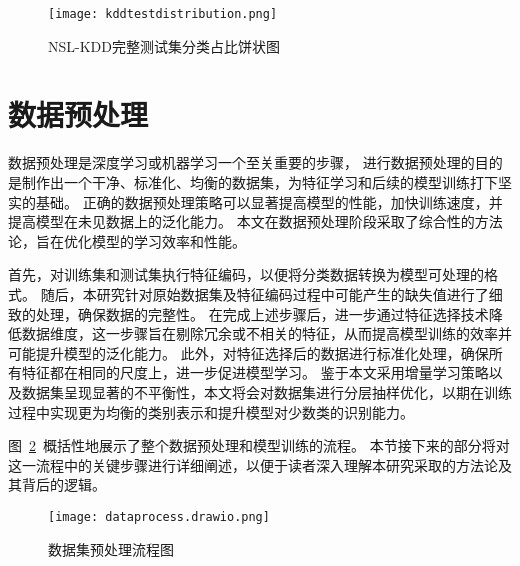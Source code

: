  \begin{figure}[htbp]
    \centering
    \texttt{[image: kddtestdistribution.png]}
    \caption{NSL-KDD完整测试集分类占比饼状图}
    \label{fig:kddtestdistribution}
  \end{figure}

\section{数据预处理}
数据预处理是深度学习或机器学习一个至关重要的步骤，
进行数据预处理的目的是制作出一个干净、标准化、均衡的数据集，为特征学习和后续的模型训练打下坚实的基础。
正确的数据预处理策略可以显著提高模型的性能，加快训练速度，并提高模型在未见数据上的泛化能力。
本文在数据预处理阶段采取了综合性的方法论，旨在优化模型的学习效率和性能。\par

首先，对训练集和测试集执行特征编码，以便将分类数据转换为模型可处理的格式。
随后，本研究针对原始数据集及特征编码过程中可能产生的缺失值进行了细致的处理，确保数据的完整性。
在完成上述步骤后，进一步通过特征选择技术降低数据维度，这一步骤旨在剔除冗余或不相关的特征，从而提高模型训练的效率并可能提升模型的泛化能力。
此外，对特征选择后的数据进行标准化处理，确保所有特征都在相同的尺度上，进一步促进模型学习。
鉴于本文采用增量学习策略以及数据集呈现显著的不平衡性，本文将会对数据集进行分层抽样优化，以期在训练过程中实现更为均衡的类别表示和提升模型对少数类的识别能力。\par

图~\ref{fig:dataprocess}~概括性地展示了整个数据预处理和模型训练的流程。
本节接下来的部分将对这一流程中的关键步骤进行详细阐述，以便于读者深入理解本研究采取的方法论及其背后的逻辑。
\begin{figure}[htbp]
  \centering
  \texttt{[image: dataprocess.drawio.png]}
  \caption{数据集预处理流程图}
  \label{fig:dataprocess}
\end{figure}

